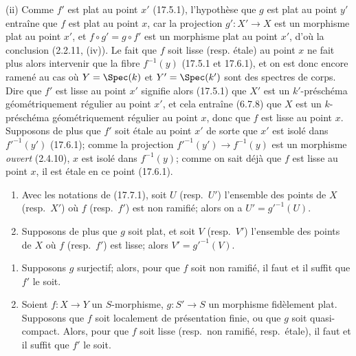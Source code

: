 (ii) Comme $f'$ est plat au point $x'$ (17.5.1), l'hypothèse que $g$ est plat au point $y'$ entraîne que $f$ est plat au point $x$, car la projection $g':X'\to X$ est un morphisme plat au point $x'$, et $f\circ g'=g\circ f'$ est un morphisme plat au point $x'$, d'où la conclusion (2.2.11, (iv)). Le fait que $f$ soit lisse (resp. étale) au point $x$ ne fait plus alors intervenir que la fibre $f^{-1}(y)$ (17.5.1 et 17.6.1), et on est donc encore ramené au cas où $Y=\Spec(k)$ et $Y'=\Spec(k')$ sont des spectres de corps. Dire que $f'$ est lisse au point $x'$ signifie alors (17.5.1) que $X'$ est un $k'$-préschéma géométriquement régulier au point $x'$, et cela entraîne (6.7.8) que $X$ est un $k$-préschéma géométriquement régulier au point $x$, donc que $f$ est lisse au point $x$. Supposons de plus que $f'$ soit étale au point $x'$ de sorte que $x'$ est isolé dans $f'^{-1}(y')$ (17.6.1); comme la projection $f'^{-1}(y')\to f^{-1}(y)$ est un morphisme \emph{ouvert} (2.4.10), $x$ est isolé dans $f^{-1}(y)$; comme on sait déjà que $f$ est lisse au point $x$, il est étale en ce point (17.6.1).

\begin{corollary}[17.7.2]
\label{IV.17.7.2}
\begin{enumerate}
  \item[\textup{(i)}] Avec les notations de \textup{(17.7.1)}, soit $U$ \textup{(resp.}\ $U'$\textup{)} l'ensemble des points de $X$ \textup{(resp.}\ $X'$\textup{)} où $f$ \textup{(resp.}\ $f'$\textup{)} est non ramifié; alors on a $U'=g'^{-1}(U)$.
  \item[\textup{(ii)}] Supposons de plus que $g$ soit plat, et soit $V$ \textup{(resp.}\ $V'$\textup{)} l'ensemble des points de $X$ où $f$ \textup{(resp.}\ $f'$\textup{)} est lisse; alors $V'=g'^{-1}(V)$.
\end{enumerate}
\end{corollary}

\begin{corollary}[17.7.3]
\label{IV.17.7.3}
\begin{enumerate}
  \item[\textup{(i)}] Supposons $g$ surjectif; alors, pour que $f$ soit non ramifié, il faut et il suffit que $f'$ le soit.
  \item[\textup{(ii)}] Soient $f:X\to Y$ un $S$-morphisme, $g:S'\to S$ un morphisme fidèlement plat. Supposons que $f$ soit localement de présentation finie, \textup{ou} que $g$ soit quasi-compact. Alors, pour que $f$ soit lisse \textup{(resp.}\ non ramifié, \textup{resp.}\ étale\textup{)}, il faut et il suffit que $f'$ le soit.
\end{enumerate}
\end{corollary}

